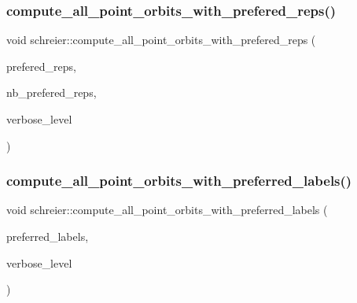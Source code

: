 \subsubsection{\texorpdfstring{compute\+\_\+all\+\_\+point\+\_\+orbits\+\_\+with\+\_\+prefered\+\_\+reps()}{compute\_all\_point\_orbits\_with\_prefered\_reps()}}
{\footnotesize\ttfamily void schreier\+::compute\+\_\+all\+\_\+point\+\_\+orbits\+\_\+with\+\_\+prefered\+\_\+reps (\begin{DoxyParamCaption}\item[{\mbox{\hyperlink{galois_8h_a09fddde158a3a20bd2dcadb609de11dc}{I\+NT}} $\ast$}]{prefered\+\_\+reps,  }\item[{\mbox{\hyperlink{galois_8h_a09fddde158a3a20bd2dcadb609de11dc}{I\+NT}}}]{nb\+\_\+prefered\+\_\+reps,  }\item[{\mbox{\hyperlink{galois_8h_a09fddde158a3a20bd2dcadb609de11dc}{I\+NT}}}]{verbose\+\_\+level }\end{DoxyParamCaption})}

\mbox{\label{classschreier_ab607b80f0184cd504f62d5c6852fb3d0}} 
\subsubsection{\texorpdfstring{compute\+\_\+all\+\_\+point\+\_\+orbits\+\_\+with\+\_\+preferred\+\_\+labels()}{compute\_all\_point\_orbits\_with\_preferred\_labels()}}
{\footnotesize\ttfamily void schreier\+::compute\+\_\+all\+\_\+point\+\_\+orbits\+\_\+with\+\_\+preferred\+\_\+labels (\begin{DoxyParamCaption}\item[{\mbox{\hyperlink{galois_8h_a09fddde158a3a20bd2dcadb609de11dc}{I\+NT}} $\ast$}]{preferred\+\_\+labels,  }\item[{\mbox{\hyperlink{galois_8h_a09fddde158a3a20bd2dcadb609de11dc}{I\+NT}}}]{verbose\+\_\+level }\end{DoxyParamCaption})}

\mbox{\label{classschreier_aa3624e59df28a3283e48a300fcfcd62f}} 
